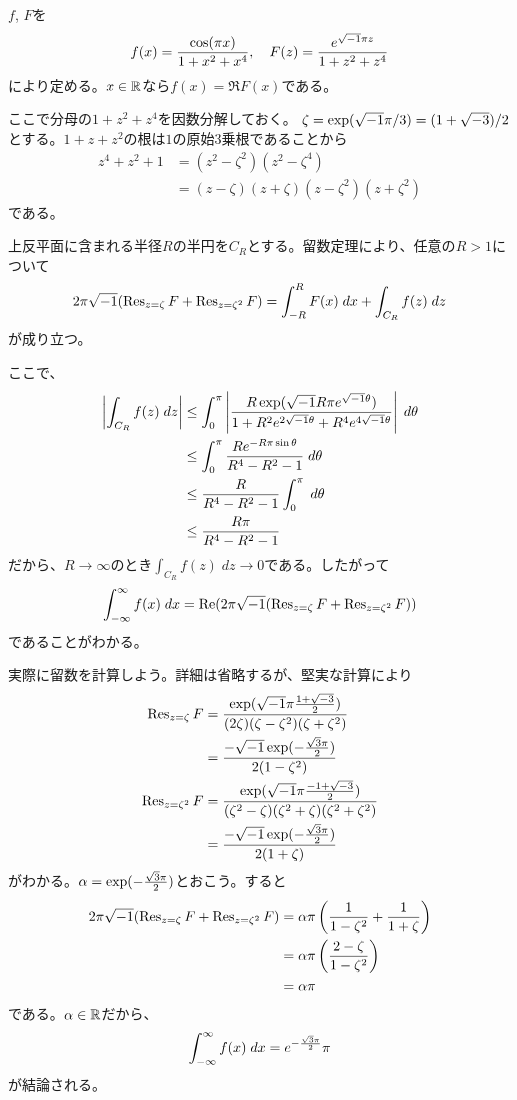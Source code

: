\begin{sol}
$f$, $F$を
    \[
    f(x) = \frac{\cos(\pi x)}{1 + x^2 + x^4}, \quad F(z) = \frac{e^{\sqrt{-1} \pi z}}{1 + z^2 + z^4}
    \]
により定める。$x \in {\mathbb R}$なら$f(x) = \Re F(x)$である。

ここで分母の$1 + z^2 + z^4$を因数分解しておく。
$\zeta = \exp(\sqrt{-1} \pi / 3) = (1 + \sqrt{-3})/ 2$とする。$1+z + z^2$の根は$1$の原始$3$乗根であることから
\begin{align*}
  z^4 + z^2 + 1 &= (z^2 - \zeta^2)(z^2 - \zeta^4) \\
  &= (z - \zeta )(z + \zeta) (z - \zeta^2)(z + \zeta^2)
\end{align*}
である。

上反平面に含まれる半径$R$の半円を$C_R$とする。留数定理により、任意の$R > 1$について
\[
2 \pi \sqrt{-1} ( \operatorname{Res}_{z=\zeta} F + \operatorname{Res}_{z=\zeta^2} F ) = \int_{-R}^R F(x) \; dx + \int_{C_R} f(z) \; dz
\]
が成り立つ。

ここで、
\begin{align*}
  \left \lvert \int_{C_R} f(z) \; dz  \right \rvert &\leq \int_0^{\pi} \left \lvert  \frac{R \exp(\sqrt{-1} R \pi e^{\sqrt{-1} {\theta}}) }{ 1 + R^2e^{2 \sqrt{-1} {\theta}} +  R^4e^{4 \sqrt{-1} {\theta}}}  \right \rvert \; d{\theta} \\
  &\leq  \int_0^{\pi} \frac{R e^{- R \pi \sin {\theta}} }{R^4 - R^2 - 1}   \; d{\theta} \\
  &\leq \frac{R  }{R^4 - R^2 - 1}  \int_0^{\pi} \; d{\theta} \\
  &\leq  \frac{R \pi }{R^4 - R^2 - 1}
\end{align*}
だから、$R \to \infty$のとき$\int_{C_R} f(z) \; dz \to 0$である。したがって
\[
 \int_{-\infty}^{\infty} f(x) \; dx =  \operatorname{Re}( 2 \pi \sqrt{-1} ( \operatorname{Res}_{z=\zeta} F + \operatorname{Res}_{z=\zeta^2} F ) )
\]
であることがわかる。

実際に留数を計算しよう。詳細は省略するが、堅実な計算により
\begin{align*}
  \operatorname{Res}_{z=\zeta} F &= \frac{ \exp(\sqrt{-1} \pi \frac{1 + \sqrt{-3}}{2} ) }{(2\zeta) (\zeta - \zeta^2) (\zeta + \zeta^2)  } \\
  &= \frac{ - \sqrt{-1} \exp(- \frac{\sqrt{3}\pi}{2} ) }{2(1 - \zeta^2)} \\
  \operatorname{Res}_{z=\zeta^2} F &= \frac{ \exp(\sqrt{-1} \pi \frac{-1 + \sqrt{-3}}{2} ) }{(\zeta^2 - \zeta) (\zeta^2 + \zeta) (\zeta^2 + \zeta^2)  } \\
  &=  \frac{ - \sqrt{-1} \exp(- \frac{\sqrt{3}\pi}{2} ) }{2(1 + \zeta)}
\end{align*}
がわかる。${\alpha} = \exp(- \frac{\sqrt{3}\pi}{2} )$とおこう。すると
\begin{align*}
  2 \pi \sqrt{-1} ( \operatorname{Res}_{z=\zeta} F + \operatorname{Res}_{z=\zeta^2} F ) &= {\alpha} \pi \left( \frac{1}{1 - \zeta^2} + \frac{1}{1+ \zeta} \right) \\
  &= {\alpha} \pi \left( \frac{2 - \zeta}{ 1 - \zeta^2} \right) \\
  &= {\alpha} \pi
\end{align*}
である。${\alpha} \in {\mathbb R}$だから、
\[
 \int_{-\infty}^{\infty} f(x) \; dx = e^{- \frac{\sqrt{3}\pi}{2} } \pi
\]
が結論される。
\end{sol}
\newpage


